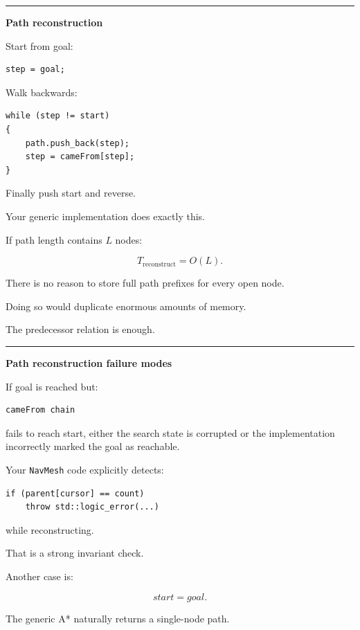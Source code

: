 \begin{center}\rule{0.5\linewidth}{0.5pt}\end{center}

\textbf{Path reconstruction}

Start from goal:

\begin{verbatim}
step = goal;
\end{verbatim}

Walk backwards:

\begin{verbatim}
while (step != start)
{
    path.push_back(step);
    step = cameFrom[step];
}
\end{verbatim}

Finally push start and reverse.

Your generic implementation does exactly this.

If path length contains \(L\) nodes:

\[
T_{\text{reconstruct}}
=
O(L).
\]

There is no reason to store full path prefixes for every open node.

Doing so would duplicate enormous amounts of memory.

The predecessor relation is enough.

\begin{center}\rule{0.5\linewidth}{0.5pt}\end{center}

\textbf{Path reconstruction failure modes}

If goal is reached but:

\begin{verbatim}
cameFrom chain
\end{verbatim}

fails to reach start, either the search state is corrupted or the implementation incorrectly marked the goal as reachable.

Your \texttt{NavMesh} code explicitly detects:

\begin{verbatim}
if (parent[cursor] == count)
    throw std::logic_error(...)
\end{verbatim}

while reconstructing.

That is a strong invariant check.

Another case is:

\[
start=goal.
\]

The generic A* naturally returns a single-node path.

